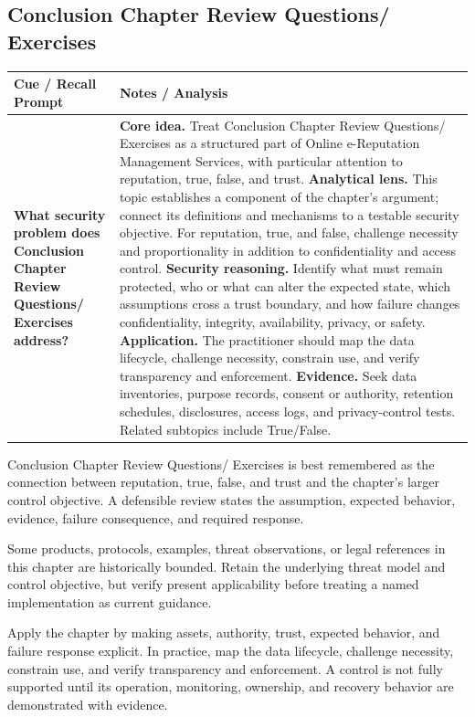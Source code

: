 \documentclass[11pt]{article}
\newcommand{\CornellHeader}{%
\rowcolor{Navy}\color{white}\bfseries Cue / Recall Prompt & \color{white}\bfseries Notes / Analysis\\\hline}
\newcommand{\CornellRow}[2]{%
\cellcolor{CueGray}\RaggedRight\textbf{#1} & \RaggedRight #2\\\hline}
\begin{document}
\subsection*{Conclusion Chapter Review Questions/ Exercises}
\begin{longtable}{>{\RaggedRight\arraybackslash}p{}|>{\RaggedRight\arraybackslash}p{}}
\CornellHeader
\CornellRow{What security problem does Conclusion Chapter Review Questions/ Exercises address?}{\textbf{Core idea.} Treat Conclusion Chapter Review Questions/ Exercises as a structured part of Online e-Reputation Management Services, with particular attention to reputation, true, false, and trust. \textbf{Analytical lens.} This topic establishes a component of the chapter's argument; connect its definitions and mechanisms to a testable security objective. For reputation, true, and false, challenge necessity and proportionality in addition to confidentiality and access control. \textbf{Security reasoning.} Identify what must remain protected, who or what can alter the expected state, which assumptions cross a trust boundary, and how failure changes confidentiality, integrity, availability, privacy, or safety. \textbf{Application.} The practitioner should map the data lifecycle, challenge necessity, constrain use, and verify transparency and enforcement. \textbf{Evidence.} Seek data inventories, purpose records, consent or authority, retention schedules, disclosures, access logs, and privacy-control tests. Related subtopics include True/False.}
\end{longtable}
\begin{topicsummary}
Conclusion Chapter Review Questions/ Exercises is best remembered as the connection between reputation, true, false, and trust and the chapter's larger control objective. A defensible review states the assumption, expected behavior, evidence, failure consequence, and required response.
\end{topicsummary}
\begin{historybox}
Some products, protocols, examples, threat observations, or legal references in this chapter are historically bounded. Retain the underlying threat model and control objective, but verify present applicability before treating a named implementation as current guidance.
\end{historybox}
\begin{defensebox}
Apply the chapter by making assets, authority, trust, expected behavior, and failure response explicit. In practice, map the data lifecycle, challenge necessity, constrain use, and verify transparency and enforcement. A control is not fully supported until its operation, monitoring, ownership, and recovery behavior are demonstrated with evidence.
\end{defensebox}
\end{document}
